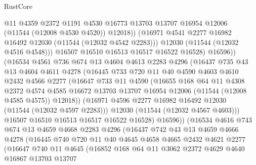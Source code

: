 \begin{lexlean}{RustCore}
\begin{coremodule}
                    @11
                    @4359
                    @2372
                    @1191
                    @4530
                    @16773
                    @13703
                    @13707
                    @16954
                    @12006
                    (@11544 (@12008 @4530 @4520))
                    @12018))
                (@16971 @4541 @2277 @16982 @16492 @12030 (@11544 (@12032 @4542 @2283)))
                @12030
                (@11544 (@12032 @4516 @4548)))
              @16507
              @16510
              @16513
              @16517
              @16522
              @16528)
            @16596))
        (@16534
          @4561
          @736
          @674
          @13
          @4604
          @4613
          @2283
          @4296
          (@16437
            @735
            @43
            @13
            @4604
            @4611
            @4278
            (@16445
              @733
              @720
              @11
              @40
              @4590
              @4603
              @4610
              @2432
              @4566
              @2277
              (@16647
                @733
                @11
                @4590
                (@16655
                  @168
                  @64
                  @11
                  @4308
                  @2372
                  @4574
                  @4585
                  @16672
                  @13703
                  @13707
                  @16954
                  @12006
                  (@11544 (@12008 @4585 @4575))
                  @12018))
              (@16971 @4596 @2277 @16982 @16492 @12030 (@11544 (@12032 @4597 @2283)))
              @12030
              (@11544 (@12032 @4567 @4603)))
            @16507
            @16510
            @16513
            @16517
            @16522
            @16528)
          @16596))
      (@16534
        @4616
        @743
        @674
        @13
        @4659
        @4668
        @2283
        @4296
        (@16437
          @742
          @43
          @13
          @4659
          @4666
          @4278
          (@16445
            @740
            @720
            @11
            @40
            @4645
            @4658
            @4665
            @2432
            @4621
            @2277
            (@16647
              @740
              @11
              @4645
              (@16852
                @168
                @64
                @11
                @3062
                @2372
                @4629
                @4640
                @16867
                @13703
                @13707

\end{coremodule}
\end{lexlean}
